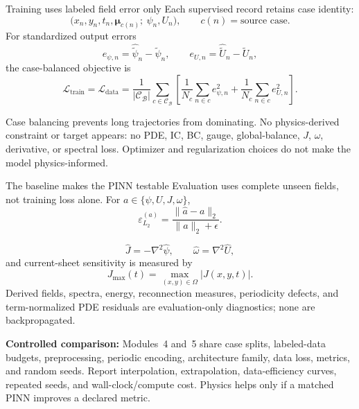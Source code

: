 \documentclass[aspectratio=169,11pt]{beamer}
\newcommand{\vect}[1]{\bm{#1}}
\newcommand{\currentmodule}{Module 1}
\newcommand{\moduleprogress}{1 of 6}
\newcommand{\setmodule}[2]{%
  \renewcommand{\currentmodule}{#1}%
  \renewcommand{\moduleprogress}{#2}%
}
\begin{document}
\setmodule{Module 4}{3 of 4}
\begin{frame}{Training uses labeled field error only}
Each supervised record retains case identity:
\[
\bigl(x_n,y_n,t_n,\vect\mu_{c(n)};\ \psi_n,U_n\bigr),
\qquad c(n)=\text{source case}.
\]
For standardized output errors
\[
e_{\psi,n}=\widehat{\widetilde\psi}_n-\widetilde\psi_n,
\qquad
e_{U,n}=\widehat{\widetilde U}_n-\widetilde U_n,
\]
the case-balanced objective is
\[
\boxed{
\mathcal L_{\mathrm{train}}=\mathcal L_{\mathrm{data}}
=\frac{1}{|\mathcal C_{\mathcal B}|}
\sum_{c\in\mathcal C_{\mathcal B}}
\left[
\frac{1}{N_c}\sum_{n\in c}e_{\psi,n}^2
+\frac{1}{N_c}\sum_{n\in c}e_{U,n}^2
\right].}
\]

Case balancing prevents long trajectories from dominating. No physics-derived constraint or target appears: no PDE, IC, BC, gauge, global-balance, $J$, $\omega$, derivative, or spectral loss. Optimizer and regularization choices do not make the model physics-informed.
\end{frame}

\setmodule{Module 4}{4 of 4}
\begin{frame}{The baseline makes the PINN testable}
Evaluation uses complete unseen fields, not training loss alone. For $a\in\{\psi,U,J,\omega\}$,
\[
\varepsilon_{L_2}^{(a)}
=\frac{\|\widehat a-a\|_2}{\|a\|_2+\epsilon}.
\]

\[
\widehat J=-\nabla^2\widehat\psi,
\qquad
\widehat\omega=\nabla^2\widehat U,
\]
and current-sheet sensitivity is measured by
\[
J_{\max}(t)=\max_{(x,y)\in\Omega}|J(x,y,t)|.
\]
Derived fields, spectra, energy, reconnection measures, periodicity defects, and term-normalized PDE residuals are evaluation-only diagnostics; none are backpropagated.

\textcolor{WarningRed}{\textbf{Controlled comparison:}} Modules~4 and~5 share case splits, labeled-data budgets, preprocessing, periodic encoding, architecture family, data loss, metrics, and random seeds.  Report interpolation, extrapolation, data-efficiency curves, repeated seeds, and wall-clock/compute cost. Physics helps only if a matched PINN improves a declared metric.
\end{frame}

\end{document}

